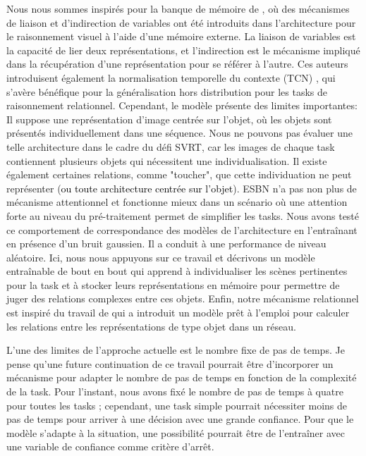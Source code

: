 Nous nous sommes inspir\'es pour la banque de m\'emoire de \citet{Webb2021EmergentST}, où des m\'ecanismes de liaison et d'indirection de variables ont \'et\'e introduits dans l'architecture pour le raisonnement visuel \`a l'aide d'une m\'emoire externe. La liaison de variables est la capacit\'e de lier deux repr\'esentations, et l'indirection est le m\'ecanisme impliqu\'e dans la r\'ecup\'eration d'une repr\'esentation pour se r\'ef\'erer \`a l'autre. Ces auteurs introduisent \'egalement la normalisation temporelle du contexte (TCN) \citep{webb2020learning}, qui s'av\`ere b\'en\'efique pour la g\'en\'eralisation hors distribution pour les tasks de raisonnement relationnel. Cependant, le mod\`ele pr\'esente des limites importantes: Il suppose une repr\'esentation d'image centr\'ee sur l'objet, où les objets sont pr\'esent\'es individuellement dans une s\'equence. Nous ne pouvons pas \'evaluer une telle architecture dans le cadre du d\'efi SVRT, car les images de chaque task contiennent plusieurs objets qui n\'ecessitent une individualisation. Il existe \'egalement certaines relations, comme "toucher", que cette individuation ne peut repr\'esenter (\textcolor{black}{ou toute architecture centr\'ee sur l'objet}). ESBN n'a pas non plus de m\'ecanisme attentionnel et fonctionne mieux dans un sc\'enario où une attention forte au niveau du pr\'e-traitement permet de simplifier les tasks. Nous avons test\'e ce comportement de correspondance des mod\`eles de l'architecture en l'entraînant en pr\'esence d'un bruit gaussien. Il a conduit \`a une performance de niveau al\'eatoire. Ici, nous nous appuyons sur ce travail et d\'ecrivons un mod\`ele entraînable de bout en bout qui apprend \`a individualiser les sc\`enes pertinentes pour la task et \`a stocker leurs repr\'esentations en m\'emoire pour permettre de juger des relations complexes entre ces objets. Enfin, notre m\'ecanisme relationnel est inspir\'e du travail de \citet{santoro2017simple} qui a introduit un mod\`ele pr\^et \`a l'emploi pour calculer les relations entre les repr\'esentations de type objet dans un r\'eseau. 


\color{black}

L'une des limites de l'approche actuelle est le nombre fixe de pas de temps. Je pense qu'une future continuation de ce travail pourrait \^etre d'incorporer un m\'ecanisme pour adapter le nombre de pas de temps en fonction de la complexit\'e de la task. Pour l'instant, nous avons fix\'e le nombre de pas de temps \`a quatre pour toutes les tasks ; cependant, une task simple pourrait n\'ecessiter moins de pas de temps pour arriver \`a une d\'ecision avec une grande confiance. Pour que le mod\`ele s'adapte \`a la situation, une possibilit\'e pourrait \^etre de l'entraîner avec une variable de confiance comme crit\`ere d'arr\^et. 

